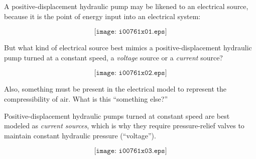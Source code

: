

A positive-displacement hydraulic pump may be likened to an electrical source, because it is the point of energy input into an electrical system:

$$\texttt{[image: i00761x01.eps]}$$

But what kind of electrical source best mimics a positive-displacement hydraulic pump turned at a constant speed, a {\it voltage} source or a {\it current} source?

$$\texttt{[image: i00761x02.eps]}$$

Also, something must be present in the electrical model to represent the compressibility of air.  What is this ``something else?''







Positive-displacement hydraulic pumps turned at constant speed are best modeled as {\it current sources}, which is why they require pressure-relief valves to maintain constant hydraulic pressure (``voltage'').







$$\texttt{[image: i00761x03.eps]}$$




